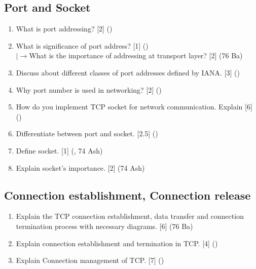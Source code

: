 \documentclass[12pt]{article}
\newcommand{\lb}{\\$\left|\rightarrow\right.$}
\begin{document}
	\subsection{Port and Socket}
		\begin{enumerate}[noitemsep, topsep=0pt]
			\item What is port addressing? \hfill [2] ()

			\item What is significance of port address? \hfill [1] ()
			\lb What is the importance of addressing at transport layer? \hfill [2] (76 Ba)

			\item Discuss about different classes of port addresses defined by IANA. \hfill [3] ()

			\item Why port number is used in networking? \hfill [2] ()

			\item How do you implement TCP socket for network communication. Explain  \hfill [6] ()

			\item Differentiate between port and socket. \hfill [2.5] ()

			\item Define socket. \hfill [1] (, 74 Ash)
			
			\item Explain socket's importance. \hfill [2] (74 Ash)
		\end{enumerate}

	\subsection{Connection establishment, Connection release}
		\begin{enumerate}[noitemsep, topsep=0pt]
			\item Explain the TCP connection establishment, data transfer and connection termination process with necessary diagrams. \hfill [6] (76 Ba)

			\item Explain connection establishment and termination in TCP. \hfill [4] ()

			\item Explain Connection management of TCP. \hfill [7] ()
		\end{enumerate}
\end{document}

